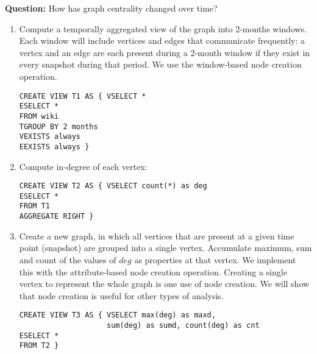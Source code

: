 {\bf Question:} How has graph centrality changed over time?

\begin{enumerate}[noitemsep,,itemindent=\dimexpr\labelwidth+\labelsep\relax,leftmargin=0pt]
\item Compute a temporally aggregated view of the graph into 2-months
  windows.  Each window will include vertices and edges that
  communicate frequently: a vertex and an edge are each present during
  a 2-month window if they exist in every snapshot during that period.
  We use the window-based node creation operation.

\vspace{-0.1cm}
\begin{small} 
\begin{verbatim}
CREATE VIEW T1 AS { VSELECT *
ESELECT *
FROM wiki
TGROUP BY 2 months
VEXISTS always
EEXISTS always }
\end{verbatim}
\end{small}

\item Compute in-degree of each vertex:

\vspace{-0.1cm}
\begin{small} 
\begin{verbatim}
CREATE VIEW T2 AS { VSELECT count(*) as deg
ESELECT *
FROM T1
AGGREGATE RIGHT }
\end{verbatim}
\end{small}

\item Create a new graph, in which all vertices that are present at a
  given time point (snapshot) are grouped into a single vertex.
  Accumulate maximum, sum and count of the values of $deg$ as
  properties at that vertex.  We implement this with the
  attribute-based node creation operation.  Creating a single vertex
  to represent the whole graph is one use of node creation.  We will
  show that node creation is useful for other types of analysis. 

\vspace{-0.1cm}
\begin{small} 
\begin{verbatim}
CREATE VIEW T3 AS { VSELECT max(deg) as maxd, 
                    sum(deg) as sumd, count(deg) as cnt
ESELECT *
FROM T2 }
\end{verbatim}
\end{small}


\end{enumerate}
